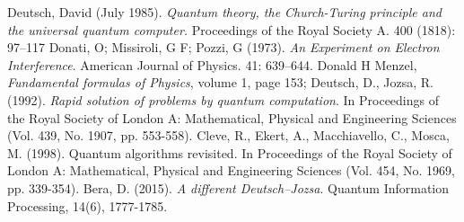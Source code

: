 \documentclass[12pt,a4paper,openright]{report}
\begin{document}
\begin{thebibliography}{20}
     Deutsch, David (July 1985). \emph{Quantum theory, the Church-Turing principle and the universal quantum computer.} Proceedings of the Royal Society A. 400 (1818): 97–117
     Donati, O; Missiroli, G F; Pozzi, G (1973). \emph{An Experiment on Electron Interference}. American Journal of Physics. 41: 639–644.
     Donald H Menzel, \emph{Fundamental formulas of Physics}, volume 1, page 153; 
     Deutsch, D., Jozsa, R. (1992). \emph{Rapid solution of problems by quantum computation}. In Proceedings of the Royal Society of London A: Mathematical, Physical and Engineering Sciences (Vol. 439, No. 1907, pp. 553-558).
     Cleve, R., Ekert, A., Macchiavello, C., Mosca, M. (1998). Quantum algorithms revisited. In Proceedings of the Royal Society of London A: Mathematical, Physical and Engineering Sciences (Vol. 454, No. 1969, pp. 339-354). 
     Bera, D. (2015). \emph{A different Deutsch–Jozsa}. Quantum Information Processing, 14(6), 1777-1785.
\end{thebibliography}
\end{document}
